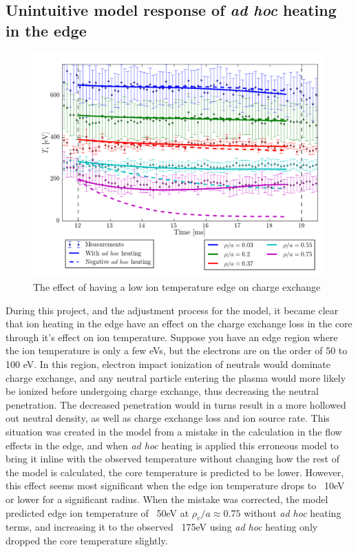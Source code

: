 \subsection{Unintuitive model response of \textit{ad hoc} heating in the edge}
\begin{figure}
    \centering
    \includegraphics{ion_transport_results/unintuitive_response.png}
    \caption{The effect of having a low ion temperature edge on charge exchange}
    \label{fig:unintuitive_cx_response}
\end{figure}

During this project, and the adjustment process for the model, it became clear that ion heating in the edge have an effect on the charge exchange loss in the core through it's effect on ion temperature. Suppose you have an edge region where the ion temperature is only a few eVs, but the electrons are on the order of 50 to 100 eV. In this region, electron impact ionization of neutrals would dominate charge exchange, and any neutral particle entering the plasma would more likely be ionized before undergoing charge exchange, thus decreasing the neutral penetration. The decreased penetration would in turns result in a more hollowed out neutral density, as well as charge exchange loss and ion source rate. This situation was created in the model from a mistake in the calculation in the flow effects in the edge, and when \textit{ad hoc} heating is applied this erroneous model to bring it inline with the observed temperature without changing how the rest of the model is calculated, the core temperature is predicted to be lower. However, this effect seems most significant when the edge ion temperature drops to ~10eV or lower for a significant radius. When the mistake was corrected, the model predicted edge ion temperature of ~50eV at $\rho_v/a \approx 0.75$ without \textit{ad hoc} heating terms, and increasing it to the observed ~175eV using \textit{ad hoc} heating only dropped the core temperature slightly.

